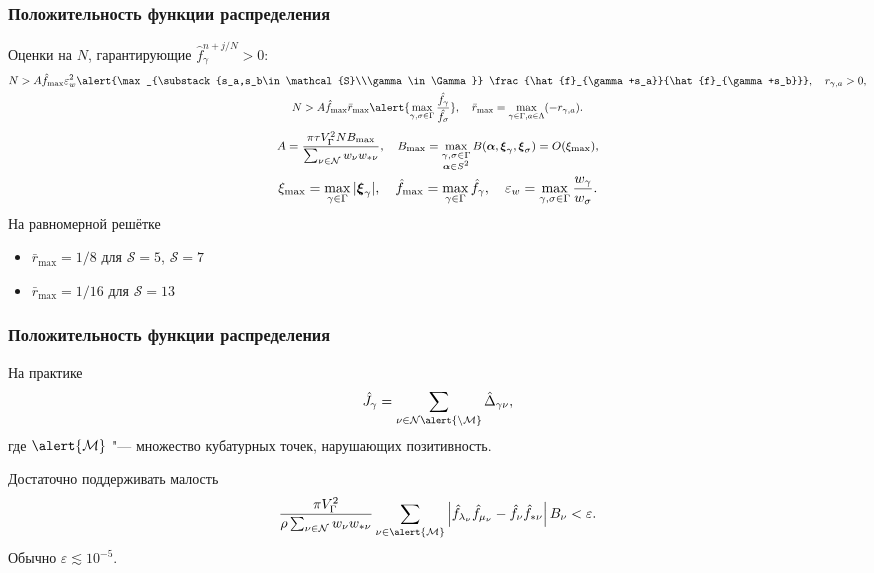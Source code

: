 \documentclass[mathserif]{beamer} %
\newcommand{\bxi}{\boldsymbol{\xi}}
\newcommand{\Nu}{\mathcal{N}}
\newcommand{\Mu}{\mathcal{M}}
\newcommand{\OO}[1]{O(#1)}
\renewcommand{\epsilon}{\varepsilon}
\begin{document}
\begin{frame}
    \frametitle{Положительность функции распределения}
    Оценки на \(N\), гарантирующие \(\hat{f}_\gamma^{n+j/N}>0\):
    \begin{gather*}
        N > A \hat{f}_{\max}\epsilon_w^2 \alert{\max_{\substack{s_a,s_b\in\mathcal{S}\\\gamma\in\Gamma}}
            \frac{\hat{f}_{\gamma+s_a}}{\hat{f}_{\gamma+s_b}}} , \quad r_{\gamma,a} > 0, \\
        N > A \hat{f}_{\max} \bar{r}_{\max} \alert{\max_{\gamma,\sigma\in\Gamma}\frac{\hat{f_\gamma}}{\hat{f_\sigma}}}, \quad
            \bar{r}_{\max} = \max_{\gamma\in\Gamma,a\in\Lambda}( -r_{\gamma,a} ).
    \end{gather*}
    \begin{gather*}
        \footnotesize
        A = \frac{\pi\tau V_\Gamma^2 N B_{\max}}{\sum_{\nu\in\Nu} w_{\nu}w_{*\nu}}, \quad
        B_{\max} = \max_{\substack{\gamma,\sigma\in\Gamma\\\boldsymbol{\alpha}\in S^2}}
            B(\boldsymbol{\alpha}, \bxi_{\gamma}, \bxi_{\sigma}) = \OO{\xi_{\max}}, \\
        \xi_{\max} = \max_{\gamma\in\Gamma}|\bxi_\gamma|, \quad
        \hat{f}_{\max} = \max_{\gamma\in\Gamma} \hat{f}_\gamma, \quad
        \epsilon_w = \max_{\gamma,\sigma\in\Gamma} \frac{w_\gamma}{w_\sigma}.
    \end{gather*}
    \pause
    На равномерной решётке
    \begin{itemize}
        \item \(\bar{r}_{\max}=1/8\) для \(\mathcal{S}=5\), \(\mathcal{S}=7\)
        \item \(\bar{r}_{\max}=1/16\) для \(\mathcal{S}=13\)
    \end{itemize}
\end{frame}

\begin{frame}
    \frametitle{Положительность функции распределения}
    На практике
    \begin{equation}
        \hat{J}_\gamma = \sum_{\nu\in\Nu\alert{\setminus\Mu}} \hat{\Delta}_{\gamma\nu},
    \end{equation}
    где \(\alert{\Mu}\) "--- множество кубатурных точек, нарушающих позитивность.
    \vspace{20pt}\pause

    Достаточно поддерживать малость
    \begin{equation}
        \frac{\pi V_\Gamma^2}{\rho\sum_{\nu\in\Nu} w_{\nu}w_{*\nu}}
        \sum_{\nu\in\alert{\Mu}} \left|
            \hat{f}_{\lambda_\nu}\hat{f}_{\mu_\nu} - \hat{f}_{\nu}\hat{f}_{*\nu}
        \right|B_\nu < \epsilon.
    \end{equation}
    Обычно \(\epsilon \lesssim 10^{-5}\).
\end{frame}
\end{document}

